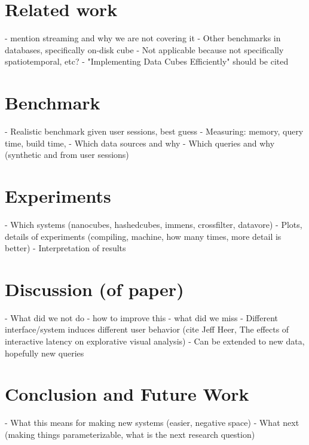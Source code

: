 \documentclass[journal]{vgtc}                %
\begin{document}
\section{Related work}
- mention streaming and why we are not covering it
- Other benchmarks in databases, specifically on-disk cube
  - Not applicable because not specifically spatiotemporal, etc?
- "Implementing Data Cubes Efficiently" should be cited

\section{Benchmark}
- Realistic benchmark given user sessions, best guess
- Measuring: memory, query time, build time, 
- Which data sources and why
- Which queries and why (synthetic and from user sessions)

\section{Experiments}
- Which systems (nanocubes, hashedcubes, immens, crossfilter, datavore)
- Plots, details of experiments (compiling, machine, how many times, more detail is better)
- Interpretation of results

\section{Discussion (of paper)}
- What did we not do
  - how to improve this
  - what did we miss
  - Different interface/system induces different user behavior (cite Jeff Heer, The effects of interactive latency on explorative visual analysis)
  - Can be extended to new data, hopefully new queries

\section{Conclusion and Future Work}
- What this means for making new systems (easier, negative space)
- What next (making things parameterizable, what is the next research question)
\end{document}
